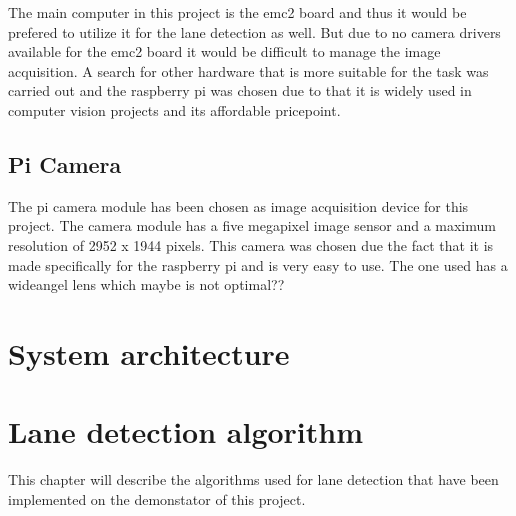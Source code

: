 The main computer in this project is the emc2 board and thus it would be prefered to utilize it for the lane detection as well. But due to no camera drivers available for the emc2 board it would be difficult to manage the image acquisition. A search for other hardware that is more suitable for the task was carried out and the raspberry pi was chosen due to that it is widely used in computer vision projects and its affordable pricepoint.

\subsection{Pi Camera}
The pi camera module has been chosen as image acquisition device for this project. The camera module has a five megapixel image sensor and a maximum resolution of 2952 x 1944 pixels. This camera was chosen due the fact that it is made specifically for the raspberry pi and is very easy to use. The one used has a wideangel lens which maybe is not optimal??





\section{System architecture}


\section{Lane detection algorithm}



This chapter will describe the algorithms used for lane detection that have been implemented on the demonstator of this project. 
